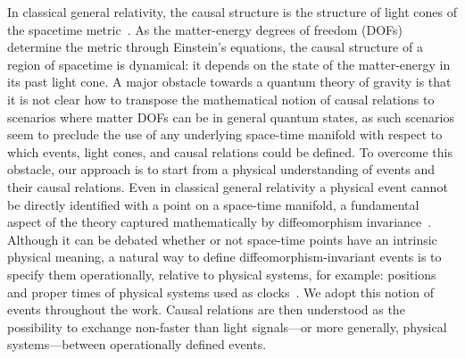 \documentclass[a4paper,11pt]{article}
\begin{document}
In classical general relativity, the causal structure is the structure of light cones of the spacetime metric~\cite{Hawking1976, Malament1977}. As the matter-energy degrees of freedom (DOFs) determine the metric through Einstein's equations, the causal structure of a region of spacetime is dynamical: it depends on the state of the matter-energy in its past light cone.
A major obstacle towards a quantum theory of gravity is that it is not clear how to transpose the mathematical notion of causal relations to scenarios where matter DOFs can be in general quantum states, as such scenarios seem to preclude the use of any underlying space-time manifold with respect to which events, light cones, and causal relations could be defined. To overcome this obstacle, our approach is to start from a physical understanding of events and their causal relations.
Even in classical general relativity a physical event cannot be directly identified with a point on a space-time manifold, a fundamental aspect of the theory captured mathematically by diffeomorphism invariance~\cite{Stachel2014}. Although it can be debated whether or not space-time points have an intrinsic physical meaning, a natural way to define diffeomorphism-invariant  events is to specify them operationally, relative to physical systems, for example: positions and proper times of physical systems used as clocks~\cite{Rovelli1991}. We adopt this notion of events throughout the work. Causal relations are then understood as the possibility to exchange non-faster than light signals---or more generally, physical systems---between operationally defined events.
%
\end{document}
